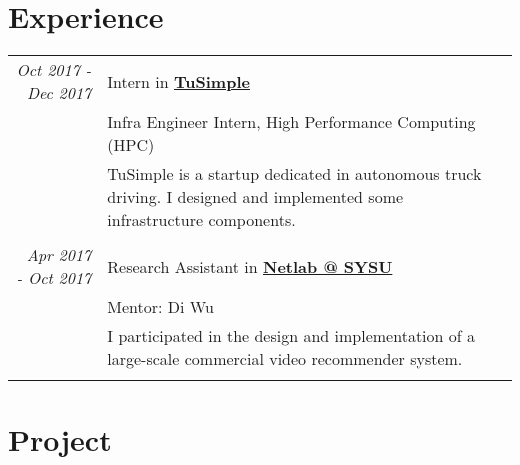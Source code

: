 \documentclass[a4paper,10pt]{article} %
\begin{document}
\section{Experience}
\begin{tabular}{r|p{11cm}}


\emph{Oct 2017 - Dec 2017} & Intern in \href{http://www.tusimple.com/index-en.html}{\textbf{TuSimple}} \\
& Infra Engineer Intern, High Performance Computing (HPC) \\
& \footnotesize{TuSimple is a startup dedicated in autonomous truck driving. I designed and implemented some infrastructure components.}\\

\multicolumn{2}{c}{} \\

\emph{Apr 2017 - Oct 2017} & Research Assistant in \href{http://netlabsysu.org}{\textbf{Netlab @ SYSU}} \\
& Mentor: Di Wu\\ 
& \footnotesize{I participated in the design and implementation of a large-scale commercial video recommender system. }\\


\multicolumn{2}{c}{} 





\end{tabular}




\section{Project}
\end{document}
